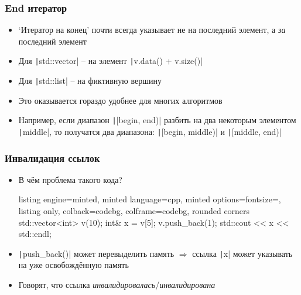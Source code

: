 \documentclass[10pt]{beamer}
\begin{document}
\begin{frame}[fragile]
\frametitle{End итератор}
\begin{itemize}
\item `Итератор на конец' почти всегда указывает не на последний элемент, а \textit{за} последний элемент
\pause
\item Для \texttt|std::vector| -- на элемент \texttt|v.data() + v.size()|
\pause
\item Для \texttt|std::list| -- на фиктивную вершину
\pause
\item Это оказывается гораздо удобнее для многих алгоритмов
\pause
\item Например, если диапазон \texttt|[begin, end)| разбить на два некоторым элементом \texttt|middle|, то получатся два диапазона: \texttt|[begin, middle)| и \texttt|[middle, end)|
\end{itemize}
\end{frame}

\begin{frame}[fragile]
\frametitle{Инвалидация ссылок}
\begin{itemize}
\item В чём проблема такого кода?
\begin{tcblisting}{listing engine=minted, minted language=cpp, minted options={fontsize=\scriptsize}, listing only, colback=codebg, colframe=codebg, rounded corners}
std::vector<int> v(10);
int& x = v[5];
v.push_back(1);
std::cout << x << std::endl;
\end{tcblisting}
\pause
{}
\item \texttt|push_back()| может перевыделить память \(\Longrightarrow\) ссылка \texttt|x| может указывать на уже освобождённую память
\pause
\item Говорят, что ссылка \textit{инвалидировалась}/\textit{инвалидирована}
\end{itemize}
\end{frame}
\end{document}
